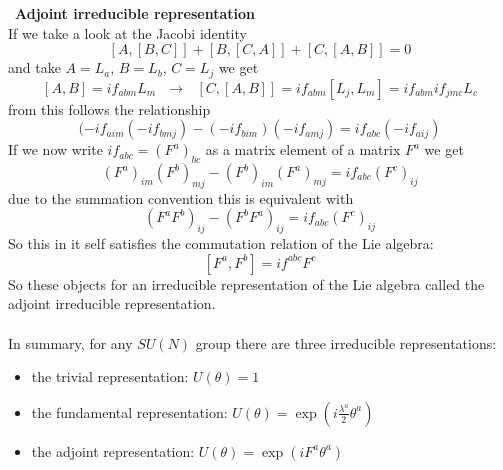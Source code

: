 \documentclass{include/thesisclass}
\newcommand{\df}{\rightarrow}
\newcommand{\sub}[1]{~\newline\newline\textbf{#1}\\}
\begin{document}
\sub{Adjoint irreducible representation}
If we take a look at the Jacobi identity
\[ [A,[B,C]] + [B,[C,A]] + [C,[A,B]] = 0\]
and take $A = L_a$, $B= L_b$, $C=L_j$ we get
\[ [A,B] = i f_{abm} L_m ~~~\df~~~ [C,[A,B]] = i f_{abm}[L_j,L_m] = if_{abm}if_{jmc} L_c\]
from this follows the relationship
\[ (-if_{aim}(-if_{bmj}) - (-if_{bim})(-if_{amj}) = if_{abc}(-if_{aij})\]
If we now write $if_{abc} = (F^a)_{bc}$ as a matrix element of a matrix $F^a$ we get
\[ (F^a)_{im} (F^b)_{mj} - (F^b)_{im}(F^a)_{mj} = i f_{abc} (F^c)_{ij}\]
due to the summation convention this is equivalent with
\[ (F^aF^b)_{ij} - (F^bF^a)_{ij} = if_{abc}(F^c)_{ij}\]
So this in it self satisfies the commutation relation of the Lie algebra:
\[ [F^a, F^b] = i f^{abc} F^c\]
So these objects for an irreducible representation of the Lie algebra called the adjoint irreducible representation.\\
\\
In summary, for any $SU(N)$ group there are three irreducible representations:
\begin{itemize}
\item the trivial representation: $U(\theta) = 1$
\item the fundamental representation: $U(\theta) = \exp\left( i \frac{\lambda^a}{2} \theta^a\right)$
\item the adjoint representation: $U(\theta) = \exp \left( i F^a \theta ^a\right)$
\end{itemize}
\end{document}
